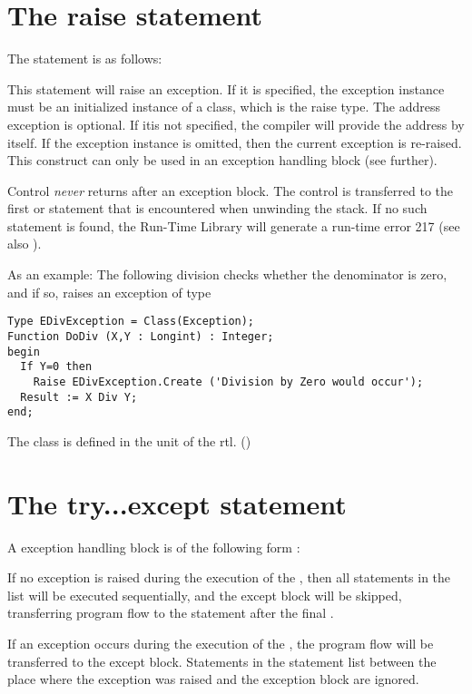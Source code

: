 \section{The raise statement}
The  statement is as follows:

This statement will raise an exception. If it is specified, the exception
instance must be an initialized instance of a class, which is the raise
type. The address exception is optional. If itis not specified, the compiler
will provide the address by itself.
If the exception instance is omitted, then the current exception is
re-raised. This construct can only be used in an exception handling
block (see further).

\begin{remark} Control {\em never} returns after an exception block. The
control is transferred to the first  or
 statement that is encountered when unwinding the stack.
If no such statement is found, the \fpc Run-Time Library will generate a
run-time error 217 (see also ).
\end{remark}

As an example: The following division checks whether the denominator is
zero, and if so, raises an exception of type 
\begin{verbatim}
Type EDivException = Class(Exception);
Function DoDiv (X,Y : Longint) : Integer;
begin
  If Y=0 then
    Raise EDivException.Create ('Division by Zero would occur');
  Result := X Div Y;
end;
\end{verbatim}
The class  is defined in the  unit of the rtl.
()

\section{The try...except statement}
A  exception handling block is of the following form :

If no exception is raised during the execution of the ,
then all statements in the list will be executed sequentially, and the
except block will be skipped, transferring program flow to the statement
after the final .

If an exception occurs during the execution of the , the
program flow will be transferred to the except block. Statements in the
statement list between the place where the exception was raised and the
exception block are ignored.

